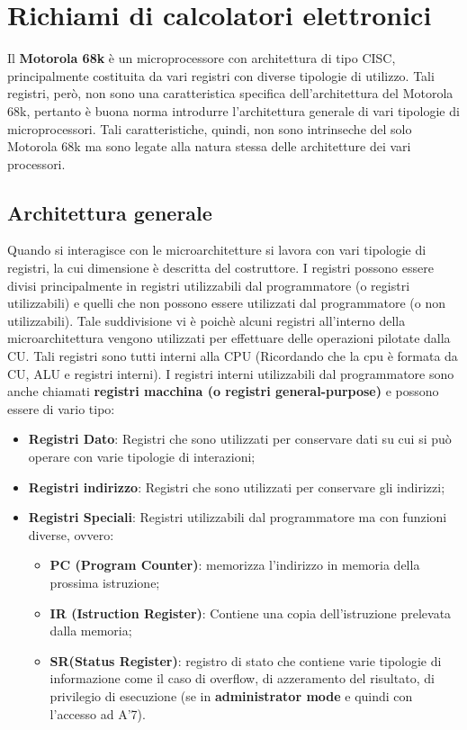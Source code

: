  \section{Richiami di calcolatori elettronici}
Il \textbf{Motorola 68k} è un microprocessore con architettura di tipo CISC, principalmente costituita da vari registri con diverse tipologie di utilizzo. Tali registri, però, non sono una caratteristica specifica dell'architettura del Motorola 68k, pertanto è buona norma introdurre l'architettura generale di vari tipologie di microprocessori. Tali caratteristiche, quindi, non sono intrinseche del solo Motorola 68k ma sono legate alla natura stessa delle architetture dei vari processori.

\subsection{Architettura generale}
Quando si interagisce con le microarchitetture si lavora con vari tipologie di registri, la cui dimensione è descritta del costruttore.
I registri possono essere divisi principalmente in registri utilizzabili dal programmatore (o registri utilizzabili) e quelli che non possono essere utilizzati dal programmatore (o non utilizzabili). Tale suddivisione vi è poichè alcuni registri all'interno della microarchitettura vengono utilizzati per effettuare delle operazioni pilotate dalla CU. Tali registri sono tutti interni alla CPU (Ricordando che la cpu è formata da CU, ALU e registri interni). I registri interni utilizzabili dal programmatore sono anche chiamati \textbf{registri macchina (o registri general-purpose)} e possono essere di vario tipo:

\begin{itemize}
    \item \textbf{Registri Dato}: Registri che sono utilizzati per conservare dati su cui si può operare con varie tipologie di interazioni;
    \item \textbf{Registri indirizzo}: Registri che sono utilizzati per conservare gli indirizzi;
    \item \textbf{Registri Speciali}: Registri utilizzabili dal programmatore ma con funzioni diverse, ovvero:
    \begin{itemize}
        \item \textbf{PC (Program Counter)}: memorizza l'indirizzo in memoria della prossima istruzione;
        \item \textbf{IR (Istruction Register)}: Contiene una copia dell'istruzione prelevata dalla memoria;
        \item \textbf{SR(Status Register)}: registro di stato che contiene varie tipologie di informazione come il caso di overflow, di azzeramento del risultato, di privilegio di esecuzione (se in \textbf{administrator mode} e quindi con l'accesso ad A'7).
    \end{itemize}
\end{itemize}

